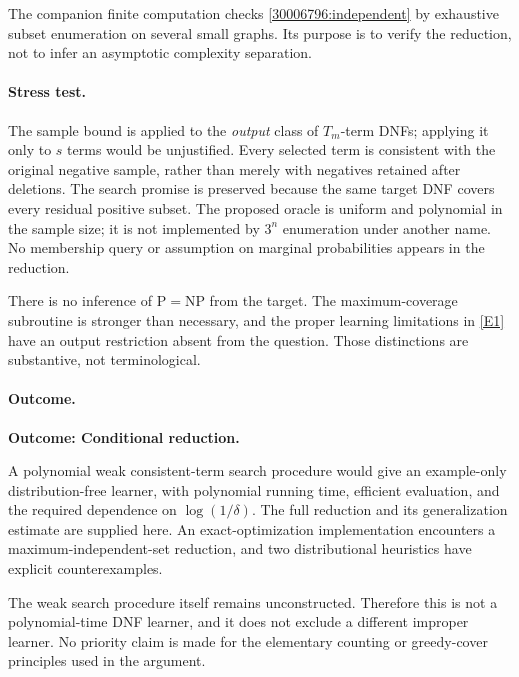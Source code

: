 \documentclass[11pt,a4paper]{article}
\newcommand{\eref}[2]{\hyperlink{extra:#1:#2}{[E#2]}}
\numberwithin{equation}{section}
\begin{document}
The companion finite computation checks \eqref{30006796:independent} by
exhaustive subset enumeration on several small graphs. Its purpose is to
verify the reduction, not to infer an asymptotic complexity separation.

\paragraph{Stress test.}
The sample bound is applied to the \emph{output} class of $T_m$-term
DNFs; applying it only to $s$ terms would be unjustified. Every selected
term is consistent with the original negative sample, rather than merely
with negatives retained after deletions. The search promise is preserved
because the same target DNF covers every residual positive subset.
The proposed oracle is uniform and polynomial in the sample size; it is
not implemented by $3^n$ enumeration under another name. No membership
query or assumption on marginal probabilities appears in the reduction.

There is no inference of $\mathrm P=\mathrm{NP}$ from the target. The
maximum-coverage subroutine is stronger than necessary, and the proper
learning limitations in \eref{30006796}{1} have an output restriction absent
from the question. Those distinctions are substantive, not terminological.

\paragraph{Outcome.}
\textbf{Outcome: Conditional reduction.}

A polynomial weak consistent-term search procedure would give an
example-only distribution-free learner, with polynomial running time,
efficient evaluation, and the required dependence on $\log(1/\delta)$.
The full reduction and its generalization estimate are supplied here.
An exact-optimization implementation encounters a maximum-independent-set
reduction, and two distributional heuristics have explicit counterexamples.

The weak search procedure itself remains unconstructed. Therefore this
is not a polynomial-time DNF learner, and it does not exclude a different
improper learner. No priority claim is made for the elementary counting
or greedy-cover principles used in the argument.
\end{document}
